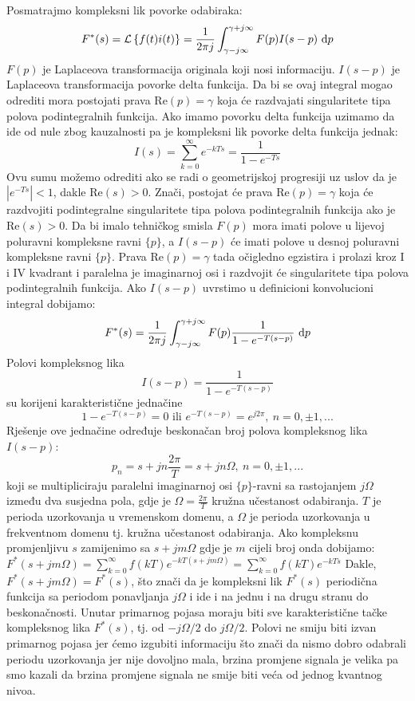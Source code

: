 \documentclass{article}
\newcommand{\suma}{\sum\limits}
\newcommand{\lap}[1]{\mathcal L \left\{ #1 \right\} }
\newenvironment{answer}{\begin{addmargin}[5pt]{0pt}}{\end{addmargin}}
\begin{document}
\begin{enumerate}
		\begin{answer}
			Posmatrajmo kompleksni lik povorke odabiraka:
				$$F^*(s) = \lap{f(t)i(t)} = \frac{1}{2\pi j} \int_{\gamma-j\infty}^{\gamma+j\infty} F(p) I(s-p)\ \text dp$$
			$F(p)$ je Laplaceova transformacija originala koji nosi informaciju. $I(s-p)$ je Laplaceova transformacija povorke delta funkcija. Da bi se ovaj integral mogao odrediti mora postojati prava Re$(p)=\gamma$ koja će razdvajati singularitete tipa polova podintegralnih funkcija. Ako imamo povorku delta funkcija uzimamo da ide od nule zbog kauzalnosti pa je kompleksni lik povorke delta funkcija jednak:
				$$I(s) = \suma_{k=0}^\infty e^{-kTs} = \frac{1}{1-e^{-Ts}}$$
			Ovu sumu možemo odrediti ako se radi o geometrijskoj progresiji uz uslov da je $\left| e^{-Ts} \right| < 1$, dakle Re$(s)>0$. Znači, postojat će prava Re$(p)=\gamma$ koja će razdvojiti podintegralne singularitete tipa polova podintegralnih funkcija ako je Re$(s)>0$. Da bi imalo tehničkog smisla $F(p)$ mora imati polove u lijevoj poluravni kompleksne ravni $\{p\}$, a $I(s-p)$ će imati polove u desnoj poluravni kompleksne ravni $\{p\}$. Prava Re$(p)=\gamma$ tada očigledno egzistira i prolazi kroz I i IV kvadrant i paralelna je imaginarnoj osi i razdvojit će singularitete tipa polova podintegralnih funkcija. Ako $I(s-p)$ uvrstimo u definicioni konvolucioni integral dobijamo:
				$$F^*(s) = \frac{1}{2\pi j} \int_{\gamma-j\infty}^{\gamma+j\infty} F(p) \frac{1}{1-e^{-T(s-p)}}\ \text dp$$
			Polovi kompleksnog lika
				$$I(s-p) = \frac{1}{1-e^{-T(s-p)}}$$
			su korijeni karakteristične jednačine
				$$1-e^{-T(s-p)}=0 \text{ ili } e^{-T(s-p)} = e^{j2\pi},\ n=0,\pm1,...$$
			Rješenje ove jednačine određuje beskonačan broj polova kompleksnog lika $I(s-p)$:
				$$p_n = s+jn\frac{2\pi}{T} = s+jn\Omega,\ n=0,\pm1,...$$
			koji se multipliciraju paralelni imaginarnoj osi $\{p\}$-ravni sa rastojanjem $j\Omega$ između dva susjedna pola, gdje je $\Omega=\frac{2\pi}{T}$ kružna učestanost odabiranja.
			$T$ je perioda uzorkovanja u vremenskom domenu, a $\Omega$ je perioda uzorkovanja u frekventnom domenu tj. kružna učestanost odabiranja. Ako kompleksnu promjenljivu $s$ zamijenimo sa $s+jm\Omega$ gdje je $m$ cijeli broj onda dobijamo:
				$F^*(s+jm\Omega) = \suma_{k=0}^\infty f(kT)e^{-kT(s+jm\Omega)} = \suma_{k=0}^\infty f(kT) e^{-kTs}$
			Dakle, $F^*(s+jm\Omega) = F^*(s)$, što znači da je kompleksni lik $F^*(s)$ periodična funkcija sa periodom ponavljanja $j\Omega$ i ide i na jednu i na drugu stranu do beskonačnosti. Unutar primarnog pojasa moraju biti sve karakteristične tačke kompleksnog lika $F^*(s)$, tj. od $-j\Omega/2$ do $j\Omega/2$. Polovi ne smiju biti izvan primarnog pojasa jer ćemo izgubiti informaciju što znači da nismo dobro odabrali periodu uzorkovanja jer nije dovoljno mala, brzina promjene signala je velika pa smo kazali da brzina promjene signala ne smije biti veća od jednog kvantnog nivoa.
		\end{answer}
		

\end{enumerate}
\end{document}

